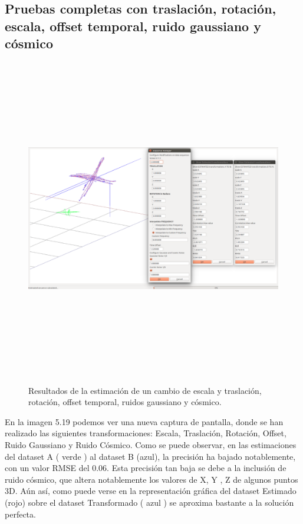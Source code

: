 \subsection{Pruebas completas con traslación, rotación, escala, offset temporal, ruido gaussiano y cósmico}
\begin{figure}[H]
\begin{center}
\label{fig:opciones de View}\includegraphics[height=14.0cm,width=18.0cm]{img/cap6/Escala_Trasla_Rota_Offset_Gauss_CosmicNoise_abba.png}
\hspace{0.5cm}
\end{center}
\caption{Resultados de la estimación de un cambio de escala y traslación, rotación, offset temporal, ruidos gaussiano y cósmico.}
\end{figure}
En la imagen 5.19 podemos ver una nueva captura de pantalla, donde se han realizado las siguientes transformaciones: Escala, Traslación, Rotación, Offset, Ruido Gaussiano y Ruido Cósmico.
Como se puede observar, en las estimaciones del dataset A ( verde ) al dataset B (azul), la precisión ha bajado notablemente, con un valor RMSE del 0.06.
Esta precisión tan baja se debe a la inclusión de ruido cósmico, que altera notablemente los valores de X, Y , Z  de algunos puntos 3D.
Aún así, como puede verse en  la representación gráfica del dataset Estimado (rojo) sobre el dataset Transformado ( azul ) se aproxima bastante a la solución perfecta.

